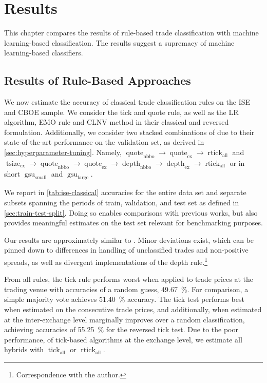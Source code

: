 \section{Results}\label{sec:results}

This chapter compares the results of rule-based trade classification with machine learning-based classification. The results suggest a supremacy of machine learning-based classifiers.

\subsection{Results of Rule-Based Approaches}\label{sec:result-of-rule-based-approaches}

We now estimate the accuracy of classical trade classification rules on the \gls{ISE} and \gls{CBOE} sample. We consider the tick and quote rule, as well as the \gls{LR} algorithm, \gls{EMO} rule and \gls{CLNV} method in their classical and reversed formulation. Additionally, we consider two stacked combinations of \textcite[][12--14]{grauerOptionTradeClassification2022} due to their state-of-the-art performance on the validation set, as derived in \cref{sec:hyperparameter-tuning}. Namely, $\operatorname{quote}_{\mathrm{nbbo}} \to \operatorname{quote}_{\mathrm{ex}} \to \operatorname{rtick}_{\mathrm{all}}$ and $\operatorname{tsize}_{\mathrm{ex}} \to \operatorname{quote}_{\mathrm{nbbo}} \to \operatorname{quote}_{\mathrm{ex}} \to \operatorname{depth}_{\mathrm{nbbo}} \to \operatorname{depth}_{\mathrm{ex}} \to \operatorname{rtick}_{\mathrm{all}}$ or in short $\operatorname{gsu}_{\mathrm{small}}$ and $\operatorname{gsu}_{\mathrm{large}}$.

We report in \cref{tab:ise-classical} accuracies for the entire data set and separate subsets spanning the periods of train, validation, and test set as defined in \cref{sec:train-test-split}. Doing so enables comparisons with previous works, but also provides meaningful estimates on the test set relevant for benchmarking purposes.

Our results are approximately similar to \textcite[][29--33]{grauerOptionTradeClassification2022}. Minor deviations exist, which can be pinned down to differences in handling of unclassified trades and non-positive spreads, as well as divergent implementations of the depth rule.\footnote{Correspondence with the author.}

From all rules, the tick rule performs worst when applied to trade prices at the trading venue with accuracies of a random guess, \SI{49.67}{\percent}. For comparison, a simple majority vote achieves \SI{51.40}{\percent} accuracy. The tick test performs best when estimated on the consecutive trade prices, and additionally, when estimated at the inter-exchange level marginally improves over a random classification, achieving accuracies of \SI{55.25}{\percent} for the reversed tick test. Due to the poor performance, of tick-based algorithms at the exchange level, we estimate all hybrids with $\operatorname{tick}_{\mathrm{all}}$ or $\operatorname{rtick}_{\mathrm{all}}$.

